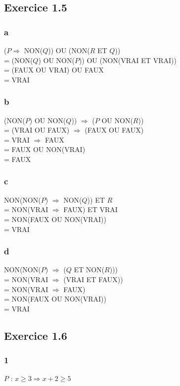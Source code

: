 \documentclass[a4paper,10pt]{report}
\begin{document}
\subsection*{Exercice 1.5}
\subsubsection*{a}
($P \Longrightarrow$ NON($Q$)) OU (NON($R$ ET $Q$)) \\
= (NON($Q$) OU NON($P$)) OU (NON(VRAI ET VRAI)) \\
= (FAUX OU VRAI) OU FAUX \\
= VRAI

\subsubsection*{b}
(NON($P$) OU NON($Q$)) $\Longrightarrow$ ($P$ OU NON($R$)) \\
= (VRAI OU FAUX) $\Longrightarrow$ (FAUX OU FAUX) \\
= VRAI $\Longrightarrow$ FAUX \\
= FAUX OU NON(VRAI) \\
= FAUX

\subsubsection*{c}
NON(NON($P$) $\Longrightarrow$ NON($Q$)) ET $R$ \\
= NON(VRAI $\Longrightarrow$ FAUX) ET VRAI \\
= NON(FAUX OU NON(VRAI)) \\
= VRAI

\subsubsection*{d}
NON(NON($P$) $\Longrightarrow$ ($Q$ ET NON($R$))) \\
= NON(VRAI $\Longrightarrow$ (VRAI ET FAUX)) \\
= NON(VRAI $\Longrightarrow$ FAUX) \\
= NON(FAUX OU NON(VRAI)) \\
= VRAI


\subsection*{Exercice 1.6}
\subsubsection*{1}
$P$ : $x\geq3 \Longrightarrow x+2 \geq 5 $
\end{document}
